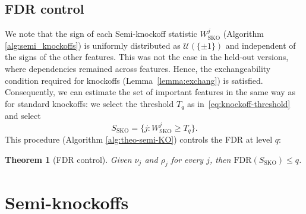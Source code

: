\documentclass{article}
\theoremstyle{plain}
\newtheorem{theorem}{Theorem}[section]
\theoremstyle{definition}
\theoremstyle{remark}
\begin{document}





 
 
\subsection{FDR control}\label{subsect:fdr_control}

%
We note that the sign of each Semi-knockoff statistic $W^j_\mathrm{SKO}$ (Algorithm \ref{alg:semi_knockoffs}) is uniformly distributed as $\mathcal{U}(\{\pm 1\})$ and independent of the signs of the other features. This was not the case in the held-out versions, where dependencies remained across features. Hence, the exchangeability condition required for knockoffs (Lemma~\ref{lemma:exchang}) is satisfied. Consequently, we can estimate the set of important features in the same way as for standard knockoffs: we select the threshold $T_q$ as in~\eqref{eq:knockoff-threshold} and select
$$S_{\mathrm{SKO}}=
\bigl\{
j : W^j_\mathrm{SKO} \ge T_q
\bigr\}.$$
This procedure (Algorithm \ref{alg:theo-semi-KO}) controls the FDR at level $q$:
%
\begin{theorem}[FDR control] 
\label{thm:FDR-control}
Given $\nu_j$ and $\rho_j$ for every $j$, then $\mathrm{FDR}(S_{\mathrm{SKO}})\leq q$.
\end{theorem}

\section{Semi-knockoffs}
\end{document}
